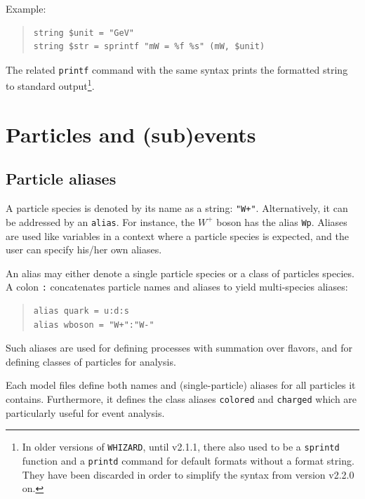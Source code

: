 \documentclass[12pt]{book}
\newcommand{\ttt}[1]{\texttt{#1}}
\newcommand{\whizard}{\ttt{WHIZARD}}
\begin{document}
Example:
\begin{quote}
\begin{footnotesize}
\begin{verbatim}
string $unit = "GeV"
string $str = sprintf "mW = %f %s" (mW, $unit)
\end{verbatim}
\end{footnotesize}
\end{quote}
The related \ttt{printf} command with the same syntax prints the formatted
string to standard output\footnote{In older versions of \whizard,
  until v2.1.1, there also used to be a \ttt{sprintd} function and a
  \ttt{printd} command for default formats without a format
  string. They have been discarded in order to simplify the syntax
  from version v2.2.0 on.}.


\section{Particles and (sub)events}

\subsection{Particle aliases}
\label{sec:alias}

A particle species is denoted by its name as a string: \verb|"W+"|.
Alternatively, it can be addressed by an \ttt{alias}.  For instance, the $W^+$
boson has the alias \ttt{Wp}.  Aliases are used like variables in a context
where a particle species is expected, and the user can specify his/her own
aliases.

An alias may either denote a single particle species or a class of particles
species.  A colon \ttt{:} concatenates particle names and aliases to yield
multi-species aliases:
\begin{quote}
\begin{footnotesize}
\begin{verbatim}
alias quark = u:d:s
alias wboson = "W+":"W-"
\end{verbatim}
\end{footnotesize}
\end{quote}
Such aliases are used for defining processes with summation over flavors, and
for defining classes of particles for analysis.

Each model files define both names and (single-particle) aliases for all
particles it contains.  Furthermore, it defines the class aliases
\verb|colored| and \verb|charged| which are particularly useful for event
analysis.
\end{document}
